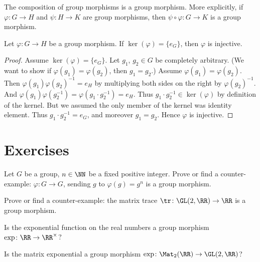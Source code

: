 \begin{theorem}
  The composition of group morphisms is a group morphism. More
  explicitly, if $\varphi\colon G\to H$ and $\psi\colon H\to K$ are
  group morphisms, then $\psi\circ\varphi\colon G\to K$ is a group morphism.
\end{theorem}

\begin{theorem}
  Let $\varphi\colon G\to H$ be a group morphism.
  If $\ker(\varphi)=\{e_{G}\}$, then $\varphi$ is injective.
\end{theorem}
\begin{proof}
  Assume $\ker(\varphi)=\{e_{G}\}$.
  Let $g_{1}$, $g_{2}\in G$ be completely arbitrary. (We want to show if
  $\varphi(g_{1})=\varphi(g_{2})$, then $g_{1}=g_{2}$.)
  Assume $\varphi(g_{1})=\varphi(g_{2})$.
  Then $\varphi(g_{1})\varphi(g_{2})^{-1}=e_{H}$ by multiplying both
  sides on the right by $\varphi(g_{2})^{-1}$.
  And $\varphi(g_{1})\varphi(g_{2}^{-1})=\varphi(g_{1}\cdot g_{2}^{-1})=e_{H}$.
  Thus $g_{1}\cdot g_{2}^{-1}\in\ker(\varphi)$ by definition of the
  kernel.
  But we assumed the only member of the kernel was identity element.
  Thus $g_{1}\cdot g_{2}^{-1}=e_{G}$, and moreover $g_{1}=g_{2}$.
  Hence $\varphi$ is injective.
\end{proof}

\section{Exercises}

\begin{exercise}
  Let $G$ be a group, $n\in\NN$ be a fixed positive integer.
  Prove or find a counter-example: $\varphi\colon G\to G$, sending $g$
  to $\varphi(g)=g^{n}$ is a group morphism.
\end{exercise}

\begin{exercise}
  Prove or find a counter-example: the matrix trace
  $\tr\colon\GL(2,\RR)\to\RR$ is a group morphism.
\end{exercise}

\begin{exercise}
  Is the exponential function on the real numbers a group morphism $\exp\colon\RR\to\RR^{\times}$?
\end{exercise}

\begin{exercise}
  Is the matrix exponential a group morphism $\exp\colon\Mat_{2}(\RR)\to\GL(2,\RR)$?
\end{exercise}

